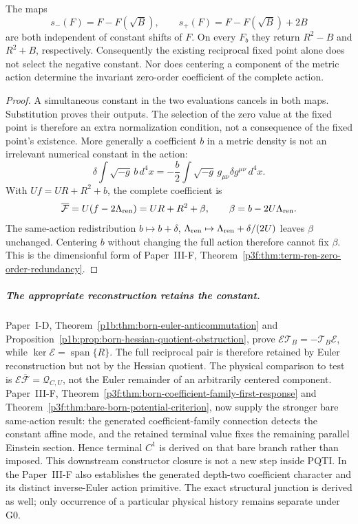 \documentclass[11pt,a4paper]{article}
\begin{document}
\begin{proposition}
\label{p3e:prop:born-centering-not-vacuum-selection}
The maps
\[
 s_-(F)=F-F(\sqrt B),\qquad
 s_+(F)=F-F(\sqrt B)+2B
\]
are both independent of constant shifts of \(F\). On every \(F_b\) they
return \(R^2-B\) and \(R^2+B\), respectively. Consequently the existing
reciprocal fixed point alone does not select the negative constant. Nor does
centering a component of the metric action determine the invariant
zero-order coefficient of the complete action.
\end{proposition}
\begin{proof}
A simultaneous constant in the two evaluations cancels in both maps.
Substitution proves their outputs. The selection of the zero value at the
fixed point is therefore an extra normalization condition, not a consequence
of the fixed point's existence. More generally a coefficient \(b\) in a
metric density is not an irrelevant numerical constant in the action:
\[
 \delta\!\int\!\sqrt{-g}\,b\,d^4x
 =-\frac b2\int\!\sqrt{-g}\,g_{\mu\nu}\delta g^{\mu\nu}\,d^4x.
\]
With \(Uf=UR+R^2+b\), the complete coefficient is
\[
 \overline{\mathcal F}=U(f-2\Lambda_{\rm ren})
 =UR+R^2+\beta,\qquad \beta=b-2U\Lambda_{\rm ren}.
\]
The same-action redistribution
\(b\mapsto b+\delta\),
\(\Lambda_{\rm ren}\mapsto\Lambda_{\rm ren}+\delta/(2U)\)
leaves \(\beta\) unchanged. Centering \(b\) without changing the full action
therefore cannot fix \(\beta\). This is the dimensionful form of
Paper~III-F, Theorem~\ref{p3f:thm:term-ren-zero-order-redundancy}.
\end{proof}

\subparagraph{The appropriate reconstruction retains the constant.}
Paper~I-D, Theorem~\ref{p1b:thm:born-euler-anticommutation} and
Proposition~\ref{p1b:prop:born-hessian-quotient-obstruction}, prove
\(\mathcal E\mathcal T_B=-\mathcal T_B\mathcal E\), while
\(\ker\mathcal E=\operatorname{span}\{R\}\). The full reciprocal pair is
therefore retained by Euler reconstruction but not by the Hessian quotient.
The physical comparison to test is
\(\mathcal E\overline{\mathcal F}=\mathscr Q_{C,U}\), not the Euler
remainder of an arbitrarily centered component. Paper~III-F,
Theorem~\ref{p3f:thm:born-coefficient-family-first-response} and
Theorem~\ref{p3f:thm:bare-born-potential-criterion}, now supply the stronger
bare same-action result: the generated coefficient-family connection detects
the constant affine mode, and the retained terminal value fixes the remaining
parallel Einstein section.  Hence terminal \(C^1\) is derived on that bare
branch rather than imposed.  This downstream constructor closure is not a new step inside PQTI.  In the
Paper~III-F also establishes the generated depth-two
coefficient character and its distinct inverse-Euler action
primitive. The exact structural
junction is derived as well; only occurrence of a particular physical history
remains separate under G0.
\end{document}

